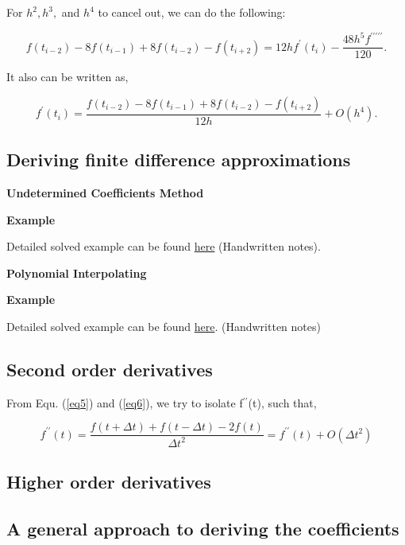 \documentclass[11pt]{article}
\theoremstyle{definition}
\begin{document}
For $h^2, h^3,$ and $h^4$ to cancel out, we can do the following:

\begin{equation}
 f(t_{i-2})-8f(t_{i-1})+ 8f(t_{i-2})- f(t_{i+2}) = 12hf^\prime(t_i)-\frac{48h^5 f^{\prime\prime\prime\prime\prime}}{120}.
\end{equation}

It also can be written as,

\begin{equation}
 f^\prime(t_i) = \frac{f(t_{i-2})-8f(t_{i-1})+ 8f(t_{i-2})- f(t_{i+2})}{12h} + O(h^4).
\end{equation}


\subsection{Deriving finite difference approximations}

\textbf{\large Undetermined Coefficients Method}\\
\begin{shaded}
\textbf{Example} 

Detailed solved example can be found \href{https://github.com/Phatimah/Internship-weekly-reports-draft/blob/main/Example1.2.pdf}{here} (Handwritten notes).
\end{shaded}

\textbf{\large Polynomial Interpolating}\\
\begin{shaded}
\textbf{Example} 

Detailed solved example can be found \href{https://github.com/Phatimah/Internship-weekly-reports-draft/blob/main/Examples/Example%201.3.pdf}{here}. (Handwritten notes)
\end{shaded}

\subsection{Second order derivatives}

From Equ. (\ref{eq5}) and (\ref{eq6}), we try to isolate f$^{\prime\prime}$(t), such that,

\begin{equation}
 f^{\prime\prime}(t)=\frac{f(t+\Delta t)+f(t-\Delta t)-2f(t)}{\Delta t^2}= f^{\prime\prime}(t)+O(\Delta t^2)
\end{equation}

\subsection{Higher order derivatives}
\subsection{A general approach to deriving the coefficients}
\end{document}

